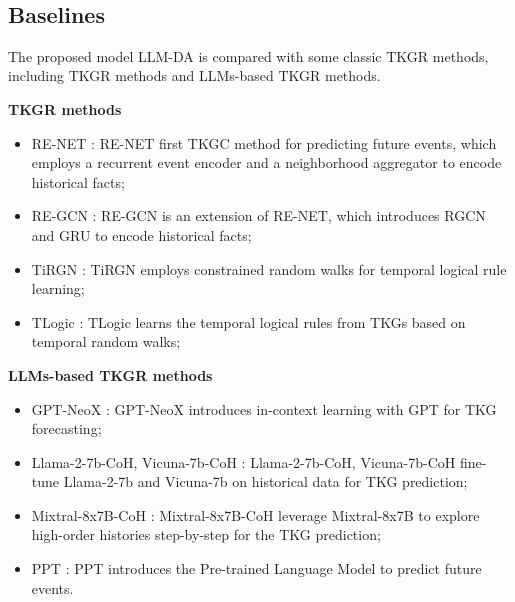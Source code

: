 \documentclass{article}
\begin{document}
\begin{table}[h]
\centering
\caption{Statistic information of whole datasets.}
  \\[2mm]
\label{tab:label_data}
\end{table}

\subsection{Baselines}\label{baseline}
The proposed model LLM-DA is compared with some classic TKGR methods, including TKGR methods and LLMs-based TKGR methods.

\textbf{TKGR methods}
\begin{itemize}
    \item RE-NET \citep{jin2019recurrent}: RE-NET first TKGC method for predicting future events, which employs a recurrent event encoder and a neighborhood aggregator to encode historical facts;
    \item RE-GCN \citep{li2021temporal}: RE-GCN is an extension of RE-NET, which introduces RGCN and GRU to encode historical facts;    
    \item TiRGN \citep{li2022tirgn}: TiRGN employs constrained random walks for temporal logical rule learning;
    \item TLogic \citep{liu2022tlogic}: TLogic learns the temporal logical rules from TKGs based on temporal random walks;
\end{itemize}

\textbf{LLMs-based TKGR methods} 
\begin{itemize}
    \item GPT-NeoX \citep{lee2023temporal}: GPT-NeoX introduces in-context learning with GPT for TKG forecasting;
    \item Llama-2-7b-CoH, Vicuna-7b-CoH \citep{luo2024chain}: Llama-2-7b-CoH, Vicuna-7b-CoH fine-tune Llama-2-7b and Vicuna-7b on historical data for TKG prediction;
    \item Mixtral-8x7B-CoH \citep{xia2024enhancing}: Mixtral-8x7B-CoH leverage Mixtral-8x7B to explore high-order histories step-by-step for the TKG prediction;
    \item PPT \citep{xu2023pre}: PPT introduces the Pre-trained Language Model to predict future events.
\end{itemize}
\end{document}
